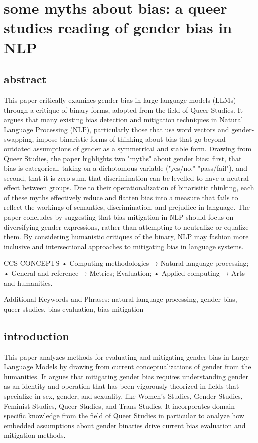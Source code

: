 \documentclass[11pt]{article}
\author{fcalado}
\date{\today}
\title{}
\begin{document}
\tableofcontents

\section{some myths about bias: a queer studies reading of gender bias in NLP}
\label{sec:orgeb386b3}
\subsection{abstract}
\label{sec:orge27d4a6}
This paper critically examines gender bias in large language models
(LLMs) through a critique of binary forms, adopted from the field of
Queer Studies. It argues that many existing bias detection and
mitigation techniques in Natural Language Processing (NLP),
particularly those that use word vectors and gender-swapping, impose
binaristic forms of thinking about bias that go beyond outdated
assumptions of gender as a symmetrical and stable form. Drawing from
Queer Studies, the paper highlights two "myths" about gender bias:
first, that bias is categorical, taking on a dichotomous variable
("yes/no," "pass/fail"), and second, that it is zero-sum, that
discrimination can be levelled to have a neutral effect between
groups. Due to their operationalization of binarisitic thinking, each
of these myths effectively reduce and flatten bias into a measure that
fails to reflect the workings of semantics, discrimination, and
prejudice in language. The paper concludes by suggesting that bias
mitigation in NLP should focus on diversifying gender expressions,
rather than attempting to neutralize or equalize them. By considering
humanistic critiques of the binary, NLP may fashion more inclusive and
intersectional approaches to mitigating bias in language systems.

CCS CONCEPTS • Computing methodologies → Natural language processing;
• General and reference → Metrics; Evaluation; • Applied computing →
Arts and humanities.

Additional Keywords and Phrases: natural language processing, gender
bias, queer studies, bias evaluation, bias mitigation

\subsection{introduction}
\label{sec:org4f1d96d}
This paper analyzes methods for evaluating and mitigating gender bias
in Large Language Models by drawing from current conceptualizations of
gender from the humanities. It argues that mitigating gender bias
requires understanding gender as an identity and operation that has
been vigorously theorized in fields that specialize in sex, gender,
and sexuality, like Women's Studies, Gender Studies, Feminist Studies,
Queer Studies, and Trans Studies. It incorporates domain-specific
knowledge from the field of Queer Studies in particular to analyze how
embedded assumptions about gender binaries drive current bias
evaluation and mitigation methods.
\end{document}

